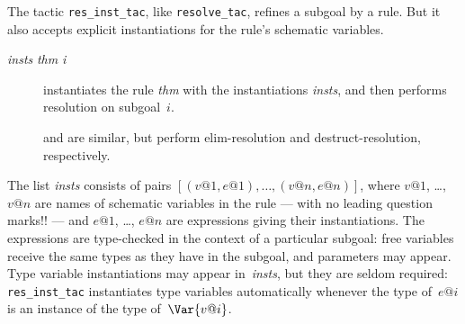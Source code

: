 The tactic {\tt res_inst_tac}, like {\tt resolve_tac}, refines a subgoal by
a rule.  But it also accepts explicit instantiations for the rule's
schematic variables.  
\begin{description}
\item[ {\it insts} {\it thm} {\it i}]
instantiates the rule {\it thm} with the instantiations {\it insts}, and
then performs resolution on subgoal~$i$.

\item[] 
and  are similar, but perform elim-resolution
and destruct-resolution, respectively.
\end{description}
The list {\it insts} consists of pairs $[(v@1,e@1), \ldots, (v@n,e@n)]$,
where $v@1$, \ldots, $v@n$ are names of schematic variables in the rule ---
with no leading question marks!! --- and $e@1$, \ldots, $e@n$ are
expressions giving their instantiations.  The expressions are type-checked
in the context of a particular subgoal: free variables receive the same
types as they have in the subgoal, and parameters may appear.  Type
variable instantiations may appear in~{\it insts}, but they are seldom
required: {\tt res_inst_tac} instantiates type variables automatically
whenever the type of~$e@i$ is an instance of the type of~$\Var{v@i}$.

